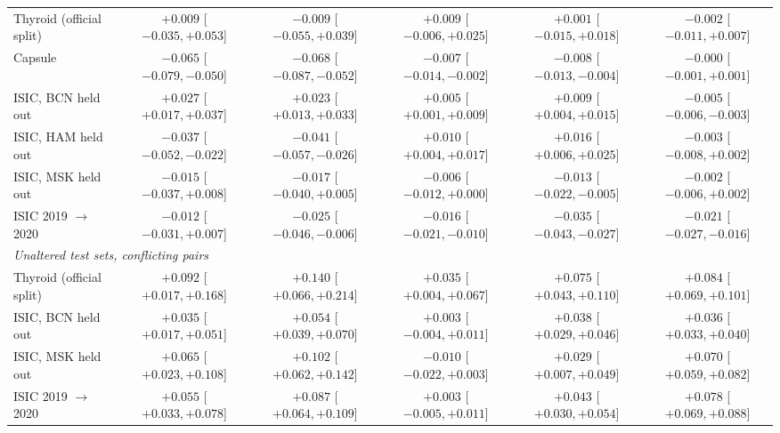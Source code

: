 \begin{table}[!tbp]
{\begin{tabular}{lccccc}
\quad Thyroid (official split) & $+0.009$ [$-0.035, +0.053$] & $-0.009$ [$-0.055, +0.039$] & $+0.009$ [$-0.006, +0.025$] & $+0.001$ [$-0.015, +0.018$] & $-0.002$ [$-0.011, +0.007$] \\
\quad Capsule & $-0.065$ [$-0.079, -0.050$] & $-0.068$ [$-0.087, -0.052$] & $-0.007$ [$-0.014, -0.002$] & $-0.008$ [$-0.013, -0.004$] & $-0.000$ [$-0.001, +0.001$] \\
\quad ISIC, BCN held out & $+0.027$ [$+0.017, +0.037$] & $+0.023$ [$+0.013, +0.033$] & $+0.005$ [$+0.001, +0.009$] & $+0.009$ [$+0.004, +0.015$] & $-0.005$ [$-0.006, -0.003$] \\
\quad ISIC, HAM held out & $-0.037$ [$-0.052, -0.022$] & $-0.041$ [$-0.057, -0.026$] & $+0.010$ [$+0.004, +0.017$] & $+0.016$ [$+0.006, +0.025$] & $-0.003$ [$-0.008, +0.002$] \\
\quad ISIC, MSK held out & $-0.015$ [$-0.037, +0.008$] & $-0.017$ [$-0.040, +0.005$] & $-0.006$ [$-0.012, +0.000$] & $-0.013$ [$-0.022, -0.005$] & $-0.002$ [$-0.006, +0.002$] \\
\quad ISIC 2019 $\to$ 2020 & $-0.012$ [$-0.031, +0.007$] & $-0.025$ [$-0.046, -0.006$] & $-0.016$ [$-0.021, -0.010$] & $-0.035$ [$-0.043, -0.027$] & $-0.021$ [$-0.027, -0.016$] \\
\multicolumn{6}{l}{\emph{Unaltered test sets, conflicting pairs}} \\
\quad Thyroid (official split) & $+0.092$ [$+0.017, +0.168$] & $+0.140$ [$+0.066, +0.214$] & $+0.035$ [$+0.004, +0.067$] & $+0.075$ [$+0.043, +0.110$] & $+0.084$ [$+0.069, +0.101$] \\
\quad ISIC, BCN held out & $+0.035$ [$+0.017, +0.051$] & $+0.054$ [$+0.039, +0.070$] & $+0.003$ [$-0.004, +0.011$] & $+0.038$ [$+0.029, +0.046$] & $+0.036$ [$+0.033, +0.040$] \\
\quad ISIC, MSK held out & $+0.065$ [$+0.023, +0.108$] & $+0.102$ [$+0.062, +0.142$] & $-0.010$ [$-0.022, +0.003$] & $+0.029$ [$+0.007, +0.049$] & $+0.070$ [$+0.059, +0.082$] \\
\quad ISIC 2019 $\to$ 2020 & $+0.055$ [$+0.033, +0.078$] & $+0.087$ [$+0.064, +0.109$] & $+0.003$ [$-0.005, +0.011$] & $+0.043$ [$+0.030, +0.054$] & $+0.078$ [$+0.069, +0.088$] \\
\bottomrule\end{tabular}}
\end{table}
